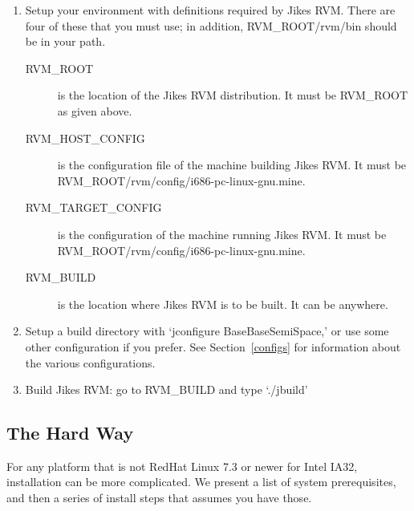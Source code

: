 \begin{enumerate}
\item Setup your environment with definitions required by Jikes RVM.
There are four of these that you must use; in addition,
RVM\_ROOT/rvm/bin should be in your path.
\begin{description}

\item[RVM\_ROOT] is the location of the Jikes RVM distribution.  It
must be RVM\_ROOT as given above.

\item[RVM\_HOST\_CONFIG] is the configuration file of the machine
building Jikes RVM.  It must be
RVM\_ROOT/rvm/config/i686-pc-linux-gnu.mine.

\item[RVM\_TARGET\_CONFIG] is the configuration of the machine running
Jikes RVM.  It must be RVM\_ROOT/rvm/config/i686-pc-linux-gnu.mine.

\item[RVM\_BUILD] is the location where Jikes RVM is to be built.  It
can be anywhere.
\end{description}

\item Setup a build directory with `jconfigure BaseBaseSemiSpace,' or
use some other configuration if you prefer. See Section~\ref{configs}
for information about the various configurations.

\item Build Jikes RVM: go to RVM\_BUILD and type `./jbuild'

\end{enumerate}

\newcommand{\gccURL}{ftp://ftp.gnu.org/gnu/gcc}
\newcommand{\glibcURL}{ftp://ftp.gnu.org/gnu/glibc}
\newcommand{\makeURL}{ftp://ftp.gnu.org/gnu/make}
\newcommand{\tarURL}{ftp://ftp.gnu.org/gnu/tar}
\newcommand{\autoconfURL}{ftp://ftp.gnu.org/gnu/autoconf}
\newcommand{\automakeURL}{ftp://ftp.gnu.org/gnu/automake}
\newcommand{\linuxPPCJDKURL}{http://www.ibm.com/java/jdk/linux/index.html}
\newcommand{\linuxKernelURL}{http://www.kernel.org}

\subsection{The Hard Way}

 For any platform that is not RedHat Linux 7.3 or newer for Intel
IA32, installation can be more complicated.  We present a list of system
prerequisites, and then a series of install steps that assumes you
have those.


